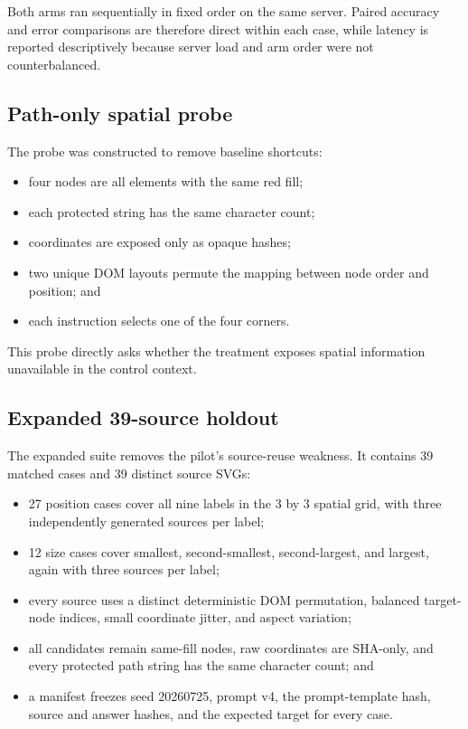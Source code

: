 \documentclass[10pt,a4paper]{article}
\newcommand{\code}[1]{\texttt{\detokenize{#1}}}
\begin{document}
Both arms ran sequentially in fixed order on the same server. Paired accuracy
and error comparisons are therefore direct within each case, while latency is
reported descriptively because server load and arm order were not
counterbalanced.

\subsection{Path-only spatial probe}

The probe was constructed to remove baseline shortcuts:

\begin{itemize}
  \item four nodes are all \code{path} elements with the same red fill;
  \item each protected \code{d} string has the same character count;
  \item coordinates are exposed only as opaque hashes;
  \item two unique DOM layouts permute the mapping between node order and
  position; and
  \item each instruction selects one of the four corners.
\end{itemize}

This probe directly asks whether the treatment exposes spatial information
unavailable in the control context.

\subsection{Expanded 39-source holdout}

The expanded suite removes the pilot's source-reuse weakness. It contains 39
matched cases and 39 distinct source SVGs:

\begin{itemize}
  \item 27 position cases cover all nine labels in the 3 by 3 spatial grid,
  with three independently generated sources per label;
  \item 12 size cases cover smallest, second-smallest, second-largest, and
  largest, again with three sources per label;
  \item every source uses a distinct deterministic DOM permutation, balanced
  target-node indices, small coordinate jitter, and aspect variation;
  \item all candidates remain same-fill \code{path} nodes, raw coordinates are
  SHA-only, and every protected path string has the same character count; and
  \item a manifest freezes seed 20260725, prompt v4, the prompt-template hash,
  source and answer hashes, and the expected target for every case.
\end{itemize}
\end{document}
